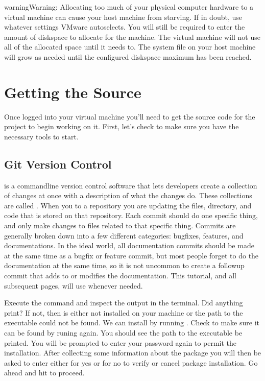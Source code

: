 \documentclass[letterpaper,10pt,english]{sphinxmanual}
\begin{document}
\begin{sphinxadmonition}{warning}{Warning:}
Allocating too much of your physical computer hardware to a virtual machine can cause your host machine from
starving. If in doubt, use whatever settings VMware auto\sphinxhyphen{}selects. You will still be required to enter the amount of
disk\sphinxhyphen{}space to allocate for the machine. The virtual machine will not use all of the allocated space until it needs
to. The system file on your host machine will grow as needed until the configured disk\sphinxhyphen{}space maximum has been
reached.
\end{sphinxadmonition}


\chapter{Getting the Source}
\label{\detokenize{newuser:getting-the-source}}
Once logged into your virtual machine you’ll need to get the source code for the project to begin working on it.
First, let’s check to make sure you have the necessary tools to start.


\section{Git Version Control}
\label{\detokenize{newuser:git-version-control}}
 is a command\sphinxhyphen{}line version control software that lets developers create a collection of
changes at once with a description of what the changes do. These collections are called . When you  to
a repository you are updating the files, directory, and code that is stored on that repository. Each commit should do
one specific thing, and only make changes to files related to that specific thing. Commits are generally broken down
into a few different categories: bug\sphinxhyphen{}fixes, features, and documentations. In the ideal world, all documentation commits
should be made at the same time as a bug\sphinxhyphen{}fix or feature commit, but most people forget to do the documentation at the
same time, so it is not uncommon to create a follow\sphinxhyphen{}up commit that adds to or modifies the documentation. This
tutorial, and all subsequent pages, will use  whenever needed.

Execute the command  and inspect the output in the terminal. Did anything print? If not, then
 is either not installed on your machine or the path to the executable could not be found. We can install
 by running . Check to make sure it can be found by runing 
again. You should see the path to the executable be printed. You will be prompted to enter your password again to
permit the installation. After collecting some information about the  package you will then be asked to
enter either  for yes or  for no to verify or cancel package installation. Go ahead and hit 
to proceed.
\end{document}
